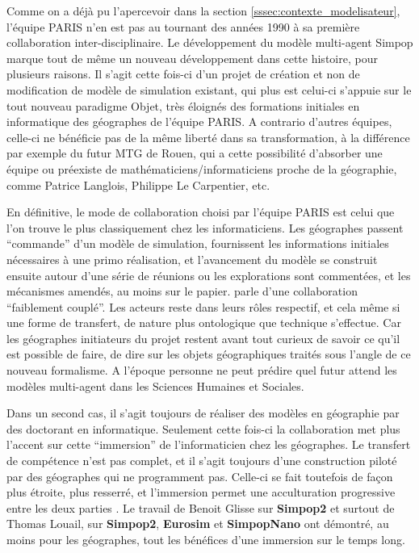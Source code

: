 Comme on a déjà pu l'apercevoir dans la section \ref{sssec:contexte_modelisateur}, l'équipe PARIS n'en est pas au tournant des années 1990 à sa première collaboration inter-disciplinaire. Le développement du modèle multi-agent Simpop \autocite{GuerinPace1993,Bura1995} marque tout de même un nouveau développement dans cette histoire, pour plusieurs raisons. Il s'agit cette fois-ci d'un projet de création et non de modification de modèle de simulation existant, qui plus est celui-ci s'appuie sur le tout nouveau paradigme Objet, très éloignés des formations initiales en informatique des géographes de l'équipe PARIS. A contrario d'autres équipes, celle-ci ne bénéficie pas de la même liberté dans sa transformation, à la différence par exemple du futur MTG de Rouen, qui a cette possibilité d'absorber  une équipe ou préexiste de mathématiciens/informaticiens proche de la géographie, comme Patrice Langlois, Philippe Le Carpentier, etc. 

En définitive, le mode de collaboration choisi par l'équipe PARIS est celui que l'on trouve le plus classiquement chez les informaticiens. Les géographes passent \enquote{commande} d'un modèle de simulation, fournissent les informations initiales nécessaires à une primo réalisation, et l'avancement du modèle se construit ensuite autour d'une série de réunions  ou les explorations sont commentées, et les mécanismes amendés, au moins sur le papier. \textcite[10]{Louail2010} parle d'une collaboration \enquote{faiblement couplé}. Les acteurs reste dans leurs rôles respectif, et cela même si une forme de transfert, de nature plus ontologique que technique  s'effectue. Car les géographes initiateurs du projet restent avant tout curieux de savoir ce qu'il est possible de faire, de dire sur les objets géographiques traités sous l'angle de ce nouveau formalisme. A l'époque personne ne peut prédire quel futur attend les modèles multi-agent dans les Sciences Humaines et Sociales. 

Dans un second cas, il s'agit toujours de réaliser des modèles en géographie par des doctorant en informatique. Seulement cette fois-ci la collaboration met plus l'accent sur cette \enquote{immersion} de l'informaticien chez les géographes. Le transfert de compétence n'est pas complet, et il s'agit toujours d'une construction piloté par des géographes qui ne programment pas. Celle-ci se fait toutefois de façon plus étroite, plus resserré, et l'immersion permet une acculturation progressive entre les deux parties \autocite[11]{Louail2010}. Le travail de Benoit Glisse sur \textbf{Simpop2} et surtout de Thomas Louail, sur \textbf{Simpop2}, \textbf{Eurosim} et \textbf{SimpopNano} ont démontré, au moins pour les géographes, tout les bénéfices d'une immersion sur le temps long. 

